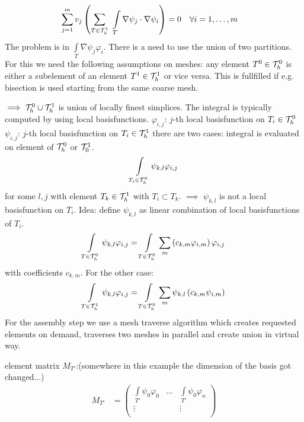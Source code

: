 \begin{example}
\begin{align*}
		\sum \limits_{j=1}^m v_j \left( \sum \limits_{T \in \T^1_h} \ \int \limits_T \nabla \psi_j \cdot \nabla \psi_i \right) &=0 \quad \forall i = 1, \dots,m
	\end{align*}
	The problem is in $\int \limits_T \nabla \psi_j  \varphi_i$. There is a need to use the union of two partitions. For this we need the following assumptions on meshes:\nl
	any element $T^0 \in \mathcal{T}^0_h$ is either a subelement of an element $T^1 \in \mathcal{T}^1_h$ or vice versa.
	This is fullfilled if e.g. bisection is used starting from the same coarse mesh.
	
	$\implies \mathcal{T}^0_h \cup \mathcal{T}^1_h$ is union of locally finest simplices. The integral is typically computed by using local basisfunctions.\nl
	$\varphi_{i,j}$: $j$-th local basisfunction on $T_i \in \mathcal{T}^0_h$\\
	$\psi_{i,j}$: $j$-th local basisfunction on $T_i \in \mathcal{T}^1_h$\nl
	there are two cases: integral is evaluated on element of $\mathcal{T}^0_h$ or $\mathcal{T}^1_0$.
	\begin{align*}
		\int \limits_{T_i  \in \mathcal{T}^0_h} \psi_{k,l} \varphi_{i,j}
	\end{align*}
	for some $l,j$ with element $T_k \in \mathcal{T}^1_h$ with $T_i \subset T_k$. $\implies$ $\psi_{k,l}$ is not a local basisfunction on $T_i$.\nl
	Idea: define $\psi_{k,l}$ as linear combination of local basisfunctions of $T_i$.
	\begin{align*}
		\int \limits_{T \in \mathcal{T}^0_h} \psi_{k,l}\varphi_{i,j} = \int \limits_{T \in \mathcal{T}^0_h} \sum \limits_m \left( c_{k,m} \varphi_{i,m} \right)\varphi_{i,j}
	\end{align*}
	with coefficients $c_{k,m}$. For the other case: 
	\begin{align*}
	\int \limits_{T \in \mathcal{T}^1_h} \psi_{k,l}\varphi_{i,j} = \int \limits_{T \in \mathcal{T}^0_h} \sum \limits_m  \psi_{k,l} \left( c_{k,m} \psi_{i,m} \right)
	\end{align*}
	For the assembly step we use a mesh traverse algorithm which creates requested elements on demand, traverses two meshes in parallel and create union in virtual way.
	
	
	element matrix $M_{T'}$:(somewhere in this example the dimension of the basis got changed...) 
	\begin{align*}
		M_{T'}&= 
		\begin{pmatrix}
		\int \limits_{T'} \psi_0\varphi_0 & \dots & \int \limits_{T'} \psi_0\varphi_n \\
		\vdots 					 		  & 	  & \vdots\\

\end{pmatrix}
\end{align*}
\end{example}
